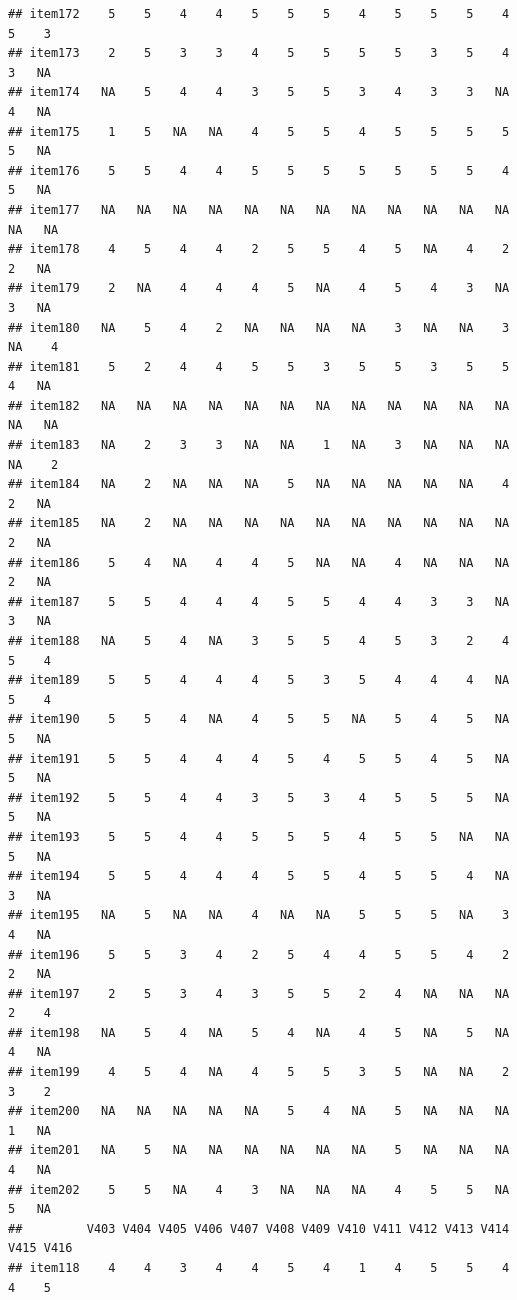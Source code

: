 \documentclass[
  man]{apa6}
\begin{document}
\begin{verbatim}
## item172    5    5    4    4    5    5    5    4    5    5    5    4    5    3
## item173    2    5    3    3    4    5    5    5    5    3    5    4    3   NA
## item174   NA    5    4    4    3    5    5    3    4    3    3   NA    4   NA
## item175    1    5   NA   NA    4    5    5    4    5    5    5    5    5   NA
## item176    5    5    4    4    5    5    5    5    5    5    5    4    5   NA
## item177   NA   NA   NA   NA   NA   NA   NA   NA   NA   NA   NA   NA   NA   NA
## item178    4    5    4    4    2    5    5    4    5   NA    4    2    2   NA
## item179    2   NA    4    4    4    5   NA    4    5    4    3   NA    3   NA
## item180   NA    5    4    2   NA   NA   NA   NA    3   NA   NA    3   NA    4
## item181    5    2    4    4    5    5    3    5    5    3    5    5    4   NA
## item182   NA   NA   NA   NA   NA   NA   NA   NA   NA   NA   NA   NA   NA   NA
## item183   NA    2    3    3   NA   NA    1   NA    3   NA   NA   NA   NA    2
## item184   NA    2   NA   NA   NA    5   NA   NA   NA   NA   NA    4    2   NA
## item185   NA    2   NA   NA   NA   NA   NA   NA   NA   NA   NA   NA    2   NA
## item186    5    4   NA    4    4    5   NA   NA    4   NA   NA   NA    2   NA
## item187    5    5    4    4    4    5    5    4    4    3    3   NA    3   NA
## item188   NA    5    4   NA    3    5    5    4    5    3    2    4    5    4
## item189    5    5    4    4    4    5    3    5    4    4    4   NA    5    4
## item190    5    5    4   NA    4    5    5   NA    5    4    5   NA    5   NA
## item191    5    5    4    4    4    5    4    5    5    4    5   NA    5   NA
## item192    5    5    4    4    3    5    3    4    5    5    5   NA    5   NA
## item193    5    5    4    4    5    5    5    4    5    5   NA   NA    5   NA
## item194    5    5    4    4    4    5    5    4    5    5    4   NA    3   NA
## item195   NA    5   NA   NA    4   NA   NA    5    5    5   NA    3    4   NA
## item196    5    5    3    4    2    5    4    4    5    5    4    2    2   NA
## item197    2    5    3    4    3    5    5    2    4   NA   NA   NA    2    4
## item198   NA    5    4   NA    5    4   NA    4    5   NA    5   NA    4   NA
## item199    4    5    4   NA    4    5    5    3    5   NA   NA    2    3    2
## item200   NA   NA   NA   NA   NA    5    4   NA    5   NA   NA   NA    1   NA
## item201   NA    5   NA   NA   NA   NA   NA   NA    5   NA   NA   NA    4   NA
## item202    5    5   NA    4    3   NA   NA   NA    4    5    5   NA    5   NA
##         V403 V404 V405 V406 V407 V408 V409 V410 V411 V412 V413 V414 V415 V416
## item118    4    4    3    4    4    5    4    1    4    5    5    4    4    5

\end{verbatim}
\end{document}
